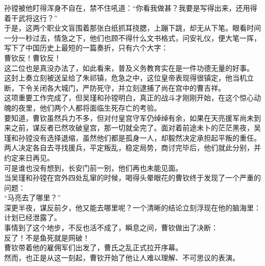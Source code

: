 \begin{multicols}{\theparacolNo}
孙镗被他盯得浑身不自在，禁不住吼道：“你看我做甚？我要是写得出来，还用得着干武将这行？”\\

于是，这两个职业文盲围着那张白纸抓耳挠腮，上蹦下跳，却无从下笔。眼看时间一分一秒过去，情急之下，他们也顾不得什么文书格式，问安礼仪，便大笔一挥，写下了中国历史上最短的一篇奏折，只有六个大字：\\

曹钦反！曹钦反！\\

这二位也是真没办法了，如此看来，普及义务教育实在是一件功德无量的好事。\\

这封上奏立刻被送呈给了朱祁镇，危急之中，这位皇帝表现得很镇定，他当机立断，下令关闭各大城门，严防死守，并立刻逮捕了尚在宫中的曹吉祥。\\

这项重要工作完成了，但吴瑾和孙镗明白，真正的战斗才刚刚开始，在这个惊心动魄的夜里，他们两个人都将面临生死存亡的考验。\\

要知道，曹钦虽然兵力不多，但对付皇宫守军仍绰绰有余，如果在天亮援军尚未到来之前，谋反者已然攻破皇宫，那一切就全完了。面对着前途未卜的茫茫黑夜，吴瑾和孙镗没有选择退缩，虽然他们都是孤身一人，却毅然决定承担起平叛的重任。\\

两人决定各自去寻找援兵，平定叛乱，稳定局势，商讨完毕后，他们就此分别，并约定来日再见。\\

可是谁也没有想到，长安门前一别，他们再也未能见面。\\

当吴瑾和孙镗在宫外四处乱窜的时候，喝得头晕眼花的曹钦终于发现了一个严重的问题：\\

“马亮去了哪里？”\\

深更半夜，谋反前夕，他又能去哪里呢？一个清晰的结论立刻浮现在他的脑海里：计划已经泄露了。\\

事情到了这个地步，不反也活不成了，瞬息之间，曹钦做出了决断：\\

反了！不是鱼死就是网破！\\

曹钦带着他的雇佣军们出发了，曹氏之乱正式拉开序幕。\\

然而，也正是从这一刻起，曹钦开始了他让人难以理解、不可思议的表演。\\


\end{multicols}
